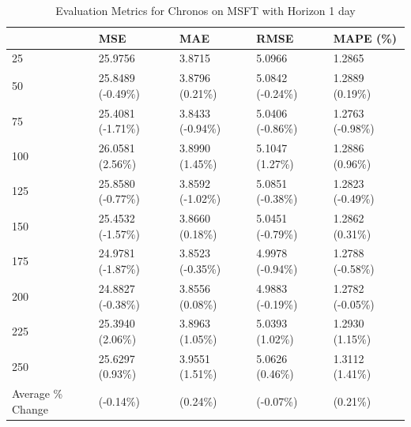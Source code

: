 \begin{table}
\caption{Evaluation Metrics for Chronos on MSFT with Horizon 1 day}
\label{tab:chronos_base_MSFT_h1_metrics}
\begin{tabular}{lllll}
\toprule
 & MSE & MAE & RMSE & MAPE (\%) \\
\midrule
25 & 25.9756 & 3.8715 & 5.0966 & 1.2865 \\
50 & 25.8489 (-0.49\%) & 3.8796 (0.21\%) & 5.0842 (-0.24\%) & 1.2889 (0.19\%) \\
75 & 25.4081 (-1.71\%) & 3.8433 (-0.94\%) & 5.0406 (-0.86\%) & 1.2763 (-0.98\%) \\
100 & 26.0581 (2.56\%) & 3.8990 (1.45\%) & 5.1047 (1.27\%) & 1.2886 (0.96\%) \\
125 & 25.8580 (-0.77\%) & 3.8592 (-1.02\%) & 5.0851 (-0.38\%) & 1.2823 (-0.49\%) \\
150 & 25.4532 (-1.57\%) & 3.8660 (0.18\%) & 5.0451 (-0.79\%) & 1.2862 (0.31\%) \\
175 & 24.9781 (-1.87\%) & 3.8523 (-0.35\%) & 4.9978 (-0.94\%) & 1.2788 (-0.58\%) \\
200 & 24.8827 (-0.38\%) & 3.8556 (0.08\%) & 4.9883 (-0.19\%) & 1.2782 (-0.05\%) \\
225 & 25.3940 (2.06\%) & 3.8963 (1.05\%) & 5.0393 (1.02\%) & 1.2930 (1.15\%) \\
250 & 25.6297 (0.93\%) & 3.9551 (1.51\%) & 5.0626 (0.46\%) & 1.3112 (1.41\%) \\
Average \% Change & (-0.14\%) & (0.24\%) & (-0.07\%) & (0.21\%) \\
\bottomrule
\end{tabular}
\end{table}
